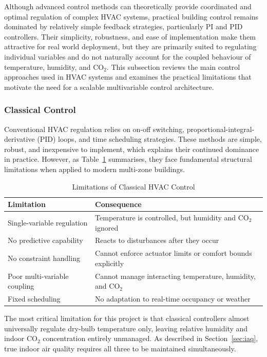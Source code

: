 \documentclass[12pt, a4paper]{article}
\begin{document}
	Although advanced control methods can theoretically provide coordinated and optimal regulation of complex HVAC systems, practical building control remains dominated by relatively simple feedback strategies, particularly PI and PID controllers. Their simplicity, robustness, and ease of implementation make them attractive for real world deployment, but they are primarily suited to regulating individual variables and do not naturally account for the coupled behaviour of temperature, humidity, and CO$_2$. This subsection reviews the main control approaches used in HVAC systems and examines the practical limitations that motivate the need for a scalable multivariable control architecture.
	
	\subsubsection{Classical Control}
	
	Conventional HVAC regulation relies on on-off switching, proportional-integral-derivative (PID) loops, and time scheduling strategies. These methods are simple, robust, and inexpensive to implement, which explains their continued dominance in practice. However, as Table~\ref{tab:classical_limits} summarises, they face fundamental structural limitations when applied to modern multi-zone buildings.
	
	\begin{table}[h]
		\centering
		\caption{Limitations of Classical HVAC Control}
		\label{tab:classical_limits}
		\begin{tabular}{lp{8cm}}
			\toprule
			\textbf{Limitation} & \textbf{Consequence} \\
			\midrule
			Single-variable regulation & Temperature is controlled, but humidity and CO$_2$ ignored \\
			No predictive capability & Reacts to disturbances after they occur \\
			No constraint handling & Cannot enforce actuator limits or comfort bounds explicitly \\
			Poor multi-variable coupling & Cannot manage interacting temperature, humidity, and CO$_2$ \\
			Fixed scheduling & No adaptation to real-time occupancy or weather \\
			\bottomrule
		\end{tabular}
	\end{table}
	
	The most critical limitation for this project is that classical controllers almost universally regulate dry-bulb temperature only, leaving relative humidity and indoor CO$_2$ concentration entirely unmanaged. As described in Section~\ref{sec:iaq}, true indoor air quality requires all three to be maintained simultaneously.
	
\end{document}
